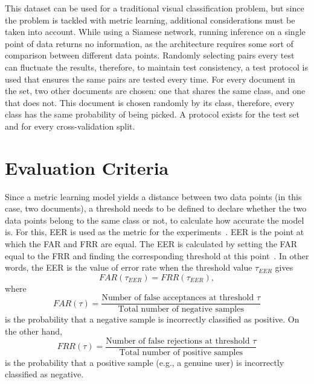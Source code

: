 This dataset can be used for a traditional visual classification problem, but since the problem is tackled with metric learning, additional considerations must be taken into account. While using a Siamese network, running inference on a single point of data returns no information, as the architecture requires some sort of comparison between different data points. Randomly selecting pairs every test can fluctuate the results, therefore, to maintain test consistency, a test protocol is used that ensures the same pairs are tested every time. For every document in the set, two other documents are chosen: one that shares the same class, and one that does not. This document is chosen randomly by its class, therefore, every class has the same probability of being picked. A protocol exists for the test set and for every cross-validation split.


\section{Evaluation Criteria}
\label{sec:evaluation}

Since a metric learning model yields a distance between two data points (in this case, two documents), a threshold needs to be defined to declare whether the two data points belong to the same class or not, to calculate how accurate the model is. For this, \gls{EER} is used as the metric for the experiments~\cite{agrawal_hybrid_2014}. \gls{EER} is the point at which the \gls{FAR} and \gls{FRR} are equal. The \gls{EER} is calculated by setting the \gls{FAR} equal to the \gls{FRR} and finding the corresponding threshold at this point~\cite{hofbauer_calculating_2016}. In other words, the \gls{EER} is the value of error rate when the threshold value $\tau_{EER}$ gives 
\begin{equation}
    FAR(\tau_{EER}) = FRR(\tau_{EER}),
\end{equation}
where
\begin{equation} \label{far}
    FAR(\tau) = \frac{\text{Number of false acceptances at threshold~} \tau}{\text{Total number of negative samples}}
\end{equation}
is the probability that a negative sample is incorrectly classified as positive. On the other hand,
\begin{equation} \label{frr}
    FRR(\tau) = \frac{\text{Number of false rejections at threshold~} \tau}{\text{Total number of positive samples}}
\end{equation}
is the probability that a positive sample (e.g., a genuine user) is incorrectly classified as negative.


